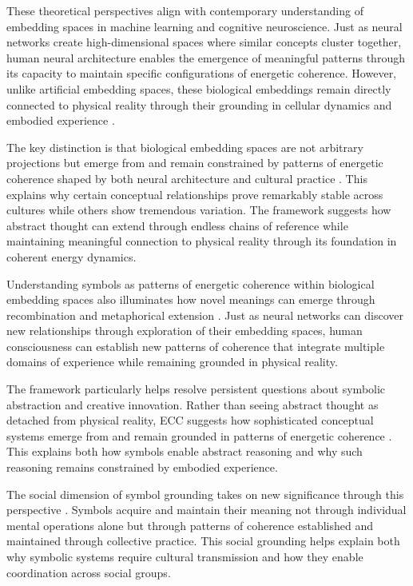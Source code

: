 These theoretical perspectives align with contemporary understanding of embedding spaces in machine learning and cognitive neuroscience. Just as neural networks create high-dimensional spaces where similar concepts cluster together, human neural architecture enables the emergence of meaningful patterns through its capacity to maintain specific configurations of energetic coherence. However, unlike artificial embedding spaces, these biological embeddings remain directly connected to physical reality through their grounding in cellular dynamics and embodied experience \cite{lakoff1999philosophy}.

The key distinction is that biological embedding spaces are not arbitrary projections but emerge from and remain constrained by patterns of energetic coherence shaped by both neural architecture and cultural practice \cite{varela1991embodied}. This explains why certain conceptual relationships prove remarkably stable across cultures while others show tremendous variation. The framework suggests how abstract thought can extend through endless chains of reference while maintaining meaningful connection to physical reality through its foundation in coherent energy dynamics.

Understanding symbols as patterns of energetic coherence within biological embedding spaces also illuminates how novel meanings can emerge through recombination and metaphorical extension \cite{lakoff1999philosophy}. Just as neural networks can discover new relationships through exploration of their embedding spaces, human consciousness can establish new patterns of coherence that integrate multiple domains of experience while remaining grounded in physical reality.

The framework particularly helps resolve persistent questions about symbolic abstraction and creative innovation. Rather than seeing abstract thought as detached from physical reality, ECC suggests how sophisticated conceptual systems emerge from and remain grounded in patterns of energetic coherence \cite{barsalou1999perceptual}. This explains both how symbols enable abstract reasoning and why such reasoning remains constrained by embodied experience.

The social dimension of symbol grounding takes on new significance through this perspective \cite{hutchins1995cognition}. Symbols acquire and maintain their meaning not through individual mental operations alone but through patterns of coherence established and maintained through collective practice. This social grounding helps explain both why symbolic systems require cultural transmission and how they enable coordination across social groups.

